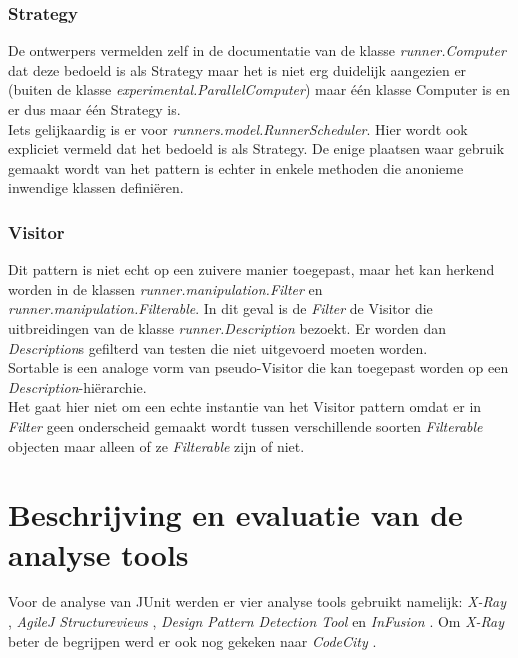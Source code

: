 \documentclass[i1]{oss}
\begin{document}
\subsubsection{Strategy}
De ontwerpers vermelden zelf in de documentatie van de klasse \emph{runner.Computer} dat deze bedoeld is als Strategy maar het is niet erg duidelijk aangezien er (buiten de klasse \emph{experimental.ParallelComputer}) maar \'e\'en klasse Computer is en er dus maar \'e\'en Strategy is.
\\
Iets gelijkaardig is er voor \emph{runners.model.RunnerScheduler}. Hier wordt ook expliciet vermeld dat het bedoeld is als Strategy. De enige plaatsen waar gebruik gemaakt wordt van het pattern is echter in enkele methoden die anonieme inwendige klassen defini\"eren.


\subsubsection{Visitor}
Dit pattern is niet echt op een zuivere manier toegepast, maar het kan herkend worden in de klassen \emph{runner.manipulation.Filter} en \emph{runner.manipulation.Filterable}. 
In dit geval is de \emph{Filter} de Visitor die uitbreidingen van de klasse \emph{runner.Description} bezoekt. 
Er worden dan \emph{Description}s gefilterd van testen die niet uitgevoerd moeten worden. 
\\
Sortable is een analoge vorm van pseudo-Visitor die kan toegepast worden op een \emph{Description}-hi\"erarchie.
\\
Het gaat hier niet om een echte instantie van het Visitor pattern omdat er in \emph{Filter} geen onderscheid gemaakt wordt tussen verschillende soorten \emph{Filterable} objecten maar alleen of ze \emph{Filterable} zijn of niet.



%
%

\section{Beschrijving en evaluatie van de analyse tools}

Voor de analyse van JUnit werden er vier analyse tools gebruikt namelijk: \emph{X-Ray} \cite{X-Ray}, \emph{AgileJ Structureviews} \cite{AgileJ Structureviews} , \emph{Design Pattern Detection Tool} \cite{Design Pattern Detection Tool} en \emph{InFusion} \cite{inFusion}. Om \emph{X-Ray} beter de begrijpen werd er ook nog gekeken naar \emph{CodeCity} \cite{CodeCity}.
\end{document}
